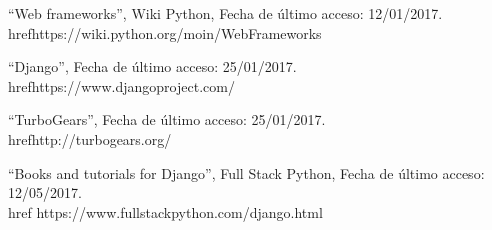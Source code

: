 

``Web frameworks'', Wiki Python, Fecha de último acceso: 12/01/2017.\\href{https://wiki.python.org/moin/WebFrameworks}

``Django'', Fecha de último acceso: 25/01/2017.\\href{https://www.djangoproject.com/}

``TurboGears'', Fecha de último acceso: 25/01/2017.\\href{http://turbogears.org/}

``Books and tutorials for Django'', Full Stack Python, Fecha de último acceso: 12/05/2017.\\href{
https://www.fullstackpython.com/django.html}